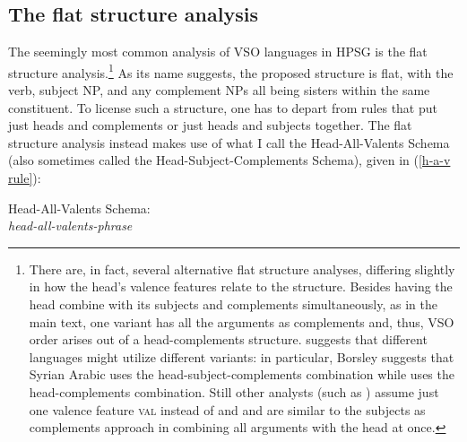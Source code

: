 \documentclass[output=paper,biblatex,babelshorthands,newtxmath,draftmode,colorlinks,citecolor=brown]{langscibook}
\begin{document}
\subsection{The flat structure analysis}
\label{understudied-sec-flat}

The seemingly most common analysis of VSO languages in HPSG is the flat structure
analysis.\footnote{There are, in fact, several alternative flat structure analyses, differing
  slightly in how the head's valence features relate to the structure. Besides having the head
  combine with its subjects and complements simultaneously, as in the main text, one variant has all
  the arguments as complements and, thus, VSO order arises out of a head-complements
  structure. \citet{borsley95} suggests that different languages might utilize different variants:
  in particular, Borsley suggests that Syrian Arabic uses the
  head-subject-complements combination while  uses the head-complements
  combination. Still other analysts (such as \citealt{ball08thesis,ball17}) assume just one valence
  feature \textsc{val} instead of \subj and \comps and are similar to the subjects as complements
  approach in combining all arguments with the head at once.} As its name suggests, the proposed structure is flat, with the verb, subject NP, and any complement NPs all being sisters within the same constituent. To license such a structure, one has to depart from rules that put just heads and complements or just heads and subjects together. The flat structure analysis instead makes use of what I call the Head-All-Valents Schema (also sometimes called the Head-Subject-Complements Schema), given in (\ref{h-a-v rule}):   


\begin{samepage}
\begin{exe}
\ex \label{h-a-v rule}
Head-All-Valents Schema:\\
\emph{head-all-valents-phrase} \impl  \\
\end{exe}
\end{samepage}
\end{document}

